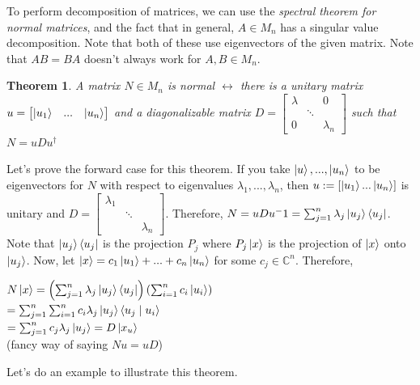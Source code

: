 \documentclass[12pt]{article}
\theoremstyle{plain}
\newtheorem{theorem}[lemma]{Theorem}
\theoremstyle{nonumberplain}
\theoremstyle{plain}
\theoremstyle{nonumberplain}
\newcommand\1{{\bf 1}}
\newcommand{\bmat}[1]{\begin{bmatrix*} #1 \end{bmatrix*}} %
\newcommand{\C}{\mathbb{C}} %
\newcommand{\<}{\left\langle}
\renewcommand{\>}{\right\rangle}
\newcommand{\inp}[2]{\left\langle#1\mid #2\right\rangle} %
\begin{document}
To perform decomposition of matrices, we can use the \textit{spectral theorem for normal matrices}, and the fact that in general, $A\in M_n$ has a singular value decomposition. Note that both of these use eigenvectors of the given matrix. Note that $AB=BA$ doesn't always work for $A,B\in M_n$.
\begin{theorem}\label{thm:stfnm}
A matrix $N\in M_n$ is normal $\longleftrightarrow$ there is a unitary matrix $u=\bmat{\ket{u_1} & ... & \ket{u_n}}$ and a diagonalizable matrix $D=\bmat{\lambda & & 0 \\ & \ddots & \\ 0 & & \lambda_n}$ such that $N=uDu^\dagger$
\end{theorem}
Let's prove the forward case for this theorem. If you take $\ket{u},...,\ket{u_n}$ to be eigenvectors for $N$ with respect to eigenvalues $\lambda_1,...,\lambda_n$, then $u:=\left[ \ket{u_1} ... \ket{u_n}\right]$ is unitary and $D=\bmat{\lambda_1 & & \\ & \ddots & \\ & & \lambda_n}$. Therefore, $N=uDu^-1=\sum^n_{j=1}\lambda_j\ket{u_j}\bra{u_j}$. Note that $\ket{u_j}\bra{u_j}$ is the projection $P_j$ where $P_j\ket{x}$ is the projection of $\ket{x}$ onto $\ket{u_j}$. Now, let $\ket{x}=c_1\ket{u_1}+...+c_n\ket{u_n}$ for some $c_j\in\C^n$. Therefore, 
\begin{center}
$N\ket{x}=\left(\sum^n_{j=1}\lambda_j\ket{u_j}\bra{u_j}\right)\left(\sum^n_{i=1}c_i\ket{u_i}\right)$ \\
$=\sum^n_{j=1} \sum^n_{i=1} c_i \lambda_j \ket{u_j} \inp{u_j}{u_i}$ \\
$=\sum^n_{j=1}c_j \lambda_j \ket{u_j}=D \ket{x_u}$ \\
(fancy way of saying $Nu=uD$)
\end{center}
Let's do an example to illustrate this theorem.
\end{document}
